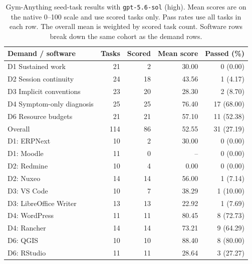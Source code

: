 \documentclass{article} %
\begin{document}
	\begin{table}[htbp]
		\centering
		\caption{Gym-Anything seed-task results with \texttt{gpt-5.6-sol}
			(high). Mean scores are on the native 0--100 scale and use scored
			tasks only. Pass rates use all tasks in each row. The overall mean
			is weighted by scored task count. Software rows break down the same
			cohort as the demand rows.}
		\label{tab:gym-anything-gpt-results}
		\small
		\renewcommand{\arraystretch}{1.15}
		\begin{tabular}{@{}lrrrr@{}}
			\toprule
			Demand / software & Tasks & Scored & Mean score & Passed (\%) \\
			\midrule
			D1 Sustained work & 21 & 2 & 30.00 & 0 (0.00) \\
			D2 Session continuity & 24 & 18 & 43.56 & 1 (4.17) \\
			D3 Implicit conventions & 23 & 20 & 28.30 & 2 (8.70) \\
			D4 Symptom-only diagnosis & 25 & 25 & 76.40 & 17 (68.00) \\
			D6 Resource budgets & 21 & 21 & 57.10 & 11 (52.38) \\
			\midrule
			Overall & 114 & 86 & 52.55 & 31 (27.19) \\
			\midrule
			D1: ERPNext & 10 & 2 & 30.00 & 0 (0.00) \\
			D1: Moodle & 11 & 0 & -- & 0 (0.00) \\
			D2: Redmine & 10 & 4 & 0.00 & 0 (0.00) \\
			D2: Nuxeo & 14 & 14 & 56.00 & 1 (7.14) \\
			D3: VS Code & 10 & 7 & 38.29 & 1 (10.00) \\
			D3: LibreOffice Writer & 13 & 13 & 22.92 & 1 (7.69) \\
			D4: WordPress & 11 & 11 & 80.45 & 8 (72.73) \\
			D4: Rancher & 14 & 14 & 73.21 & 9 (64.29) \\
			D6: QGIS & 10 & 10 & 88.40 & 8 (80.00) \\
			D6: RStudio & 11 & 11 & 28.64 & 3 (27.27) \\
			\bottomrule
		\end{tabular}
	\end{table}
\end{document}
